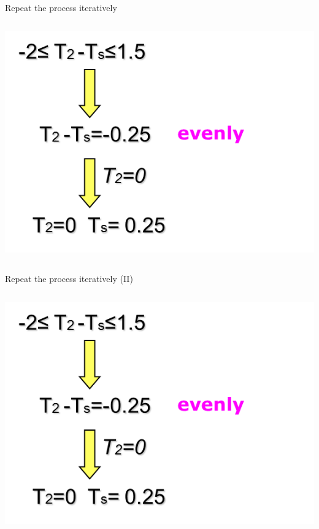 \documentclass[10pt,ignorenonframetext,mathserif,onlymath]{beamer}
\begin{document}
\begin{frame}{Repeat the process iteratively}
\protect\hypertarget{repeat-the-process-iteratively}{}

\begin{columns}

\pause
{}

\includegraphics{lec05.files/fig15.png}\\
\end{columns}

\end{frame}

\begin{frame}{Repeat the process iteratively (II)}
\protect\hypertarget{repeat-the-process-iteratively-ii}{}

\begin{columns}


\includegraphics{lec05.files/fig15.png}\\
\end{columns}
 
\end{frame}
\end{document}
